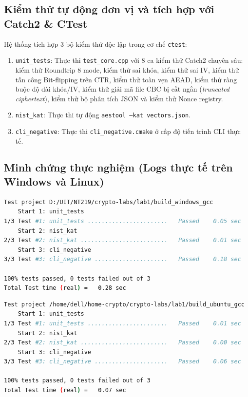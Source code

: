 \documentclass[12pt, a4paper]{report}
\begin{document}
\subsection{Kiểm thử tự động đơn vị và tích hợp với Catch2 \& CTest}
Hệ thống tích hợp 3 bộ kiểm thử độc lập trong cơ chế \texttt{ctest}:
\begin{enumerate}
    \item \texttt{unit\_tests}: Thực thi \texttt{test\_core.cpp} với 8 ca kiểm thử Catch2 chuyên sâu: kiểm thử Roundtrip 8 mode, kiểm thử sai khóa, kiểm thử sai IV, kiểm thử tấn công Bit-flipping trên CTR, kiểm thử toàn vẹn AEAD, kiểm thử ràng buộc độ dài khóa/IV, kiểm thử giải mã file CBC bị cắt ngắn (\textit{truncated ciphertext}), kiểm thử bộ phân tích JSON và kiểm thử Nonce registry.
    \item \texttt{nist\_kat}: Thực thi tự động \texttt{aestool --kat vectors.json}.
    \item \texttt{cli\_negative}: Thực thi \texttt{cli\_negative.cmake} ở cấp độ tiến trình CLI thực tế.
\end{enumerate}

\subsection{Minh chứng thực nghiệm (Logs thực tế trên Windows và Linux)}

\begin{lstlisting}[language=bash, caption={Biên bản CTest trên Windows 10 (MinGW-w64 GCC)}]
Test project D:/UIT/NT219/crypto-labs/lab1/build_windows_gcc
    Start 1: unit_tests
1/3 Test #1: unit_tests .......................   Passed    0.05 sec
    Start 2: nist_kat
2/3 Test #2: nist_kat .........................   Passed    0.01 sec
    Start 3: cli_negative
3/3 Test #3: cli_negative .....................   Passed    0.18 sec

100% tests passed, 0 tests failed out of 3
Total Test time (real) =   0.28 sec
\end{lstlisting}

\begin{lstlisting}[language=bash, caption={Biên bản CTest trên Ubuntu 22.04 LTS (GCC 11.4)}]
Test project /home/dell/home-crypto/crypto-labs/lab1/build_ubuntu_gcc
    Start 1: unit_tests
1/3 Test #1: unit_tests .......................   Passed    0.01 sec
    Start 2: nist_kat
2/3 Test #2: nist_kat .........................   Passed    0.00 sec
    Start 3: cli_negative
3/3 Test #3: cli_negative .....................   Passed    0.06 sec

100% tests passed, 0 tests failed out of 3
Total Test time (real) =   0.07 sec
\end{lstlisting}
\end{document}
